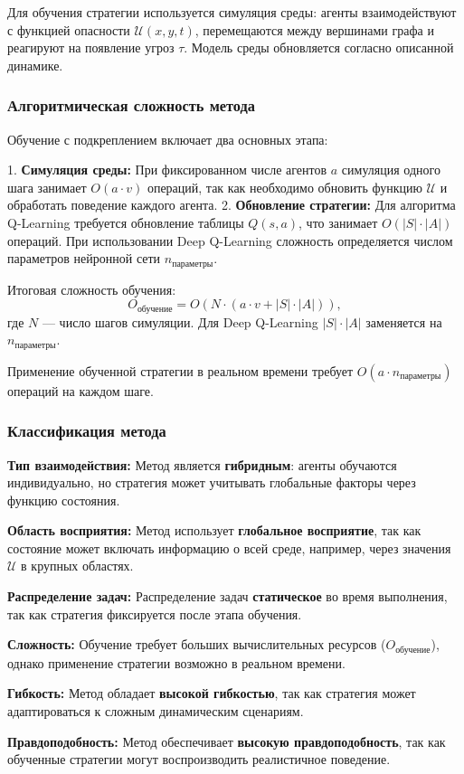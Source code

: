 Для обучения стратегии используется симуляция среды: агенты взаимодействуют с функцией опасности $\mathcal{U}(x, y, t)$, перемещаются между вершинами графа и реагируют на появление угроз $\tau$.
Модель среды обновляется согласно описанной динамике.

\subsubsection*{Алгоритмическая сложность метода}
Обучение с подкреплением включает два основных этапа:

1. \textbf{Симуляция среды:} При фиксированном числе агентов $a$ симуляция одного шага занимает $O(a \cdot v)$ операций, так как необходимо обновить функцию $\mathcal{U}$ и обработать поведение каждого агента.
2. \textbf{Обновление стратегии:} Для алгоритма Q-Learning требуется обновление таблицы $Q(s, a)$, что занимает $O(|S| \cdot |A|)$ операций.
При использовании Deep Q-Learning сложность определяется числом параметров нейронной сети $n_{\text{параметры}}$.

Итоговая сложность обучения:
\begin{equation}
	O_{\text{обучение}} = O(N \cdot (a \cdot v + |S| \cdot |A|)),
\end{equation}
где $N$ — число шагов симуляции.
Для Deep Q-Learning $|S| \cdot |A|$ заменяется на $n_{\text{параметры}}$.

Применение обученной стратегии в реальном времени требует $O(a \cdot n_{\text{параметры}})$ операций на каждом шаге.

\subsubsection*{Классификация метода}
\textbf{Тип взаимодействия:}  
Метод является \textbf{гибридным}: агенты обучаются индивидуально, но стратегия может учитывать глобальные факторы через функцию состояния.  

\textbf{Область восприятия:}  
Метод использует \textbf{глобальное восприятие}, так как состояние может включать информацию о всей среде, например, через значения $\mathcal{U}$ в крупных областях.  

\textbf{Распределение задач:}  
Распределение задач \textbf{статическое} во время выполнения, так как стратегия фиксируется после этапа обучения.  

\textbf{Сложность:}  
Обучение требует больших вычислительных ресурсов ($O_{\text{обучение}}$), однако применение стратегии возможно в реальном времени.  

\textbf{Гибкость:}  
Метод обладает \textbf{высокой гибкостью}, так как стратегия может адаптироваться к сложным динамическим сценариям.  

\textbf{Правдоподобность:}  
Метод обеспечивает \textbf{высокую правдоподобность}, так как обученные стратегии могут воспроизводить реалистичное поведение.
